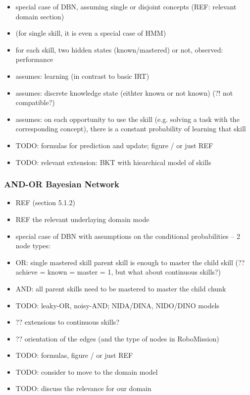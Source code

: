 \begin{itemize}
\item special case of DBN, assuming single or disjoint concepts (REF: relevant domain section)
\item (for single skill, it is even a special case of HMM)
\item for each skill, two hidden states (known/mastered) or not, observed: performance
\item assumes: learning (in contrast to basic IRT)
\item assumes: discrete knowledge state (eithter known or not known) (?! not compatible?)
\item assumes: on each opportunity to use the skill (e.g. solving a task with
  the corresponding concept), there is a constant probability of learning that skill
\item TODO: formulas for prediction and update; figure / or just REF
\item TODO: relevant extension: BKT with hiearchical model of skills
\end{itemize}


\subsubsection{AND-OR Bayesian Network}

\begin{itemize}
\item REF \cite{student-models-review-2012} (section 5.1.2)
\item REF the relevant underlaying domain mode
\item special case of DBN with assumptions on the conditional probabilities -- 2 node types:
\item OR: single mastered skill parent skill is enough to master the child skill
  (?? achieve = known = master = 1, but what about continuous skills?)
\item AND: all parent skills need to be mastered to master the child chunk
\item TODO: leaky-OR, noisy-AND; NIDA/DINA, NIDO/DINO models
\item ?? extensions to continuous skills?
\item ?? orientation of the edges (and the type of nodes in RoboMission)
\item TODO: formulas, figure / or just REF
\item TODO: consider to move to the domain model
\item TODO: discuss the relevance for our domain
\end{itemize}




